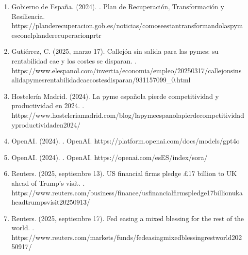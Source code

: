 \documentclass[letterpaper,10pt,spanish]{sphinxmanual}
\begin{document}
\begin{enumerate}
\item {} 
\sphinxAtStartPar
Gobierno de España. (2024). . Plan de Recuperación, Transformación y Resiliencia. https://planderecuperacion.gob.es/noticias/como\sphinxhyphen{}se\sphinxhyphen{}estan\sphinxhyphen{}transformando\sphinxhyphen{}las\sphinxhyphen{}pymes\sphinxhyphen{}con\sphinxhyphen{}el\sphinxhyphen{}plan\sphinxhyphen{}de\sphinxhyphen{}recuperacion\sphinxhyphen{}prtr

\item {} 
\sphinxAtStartPar
Gutiérrez, C. (2025, marzo 17). Callejón sin salida para las pymes: su rentabilidad cae y los costes se disparan. . https://www.elespanol.com/invertia/economia/empleo/20250317/callejon\sphinxhyphen{}sin\sphinxhyphen{}salida\sphinxhyphen{}pymes\sphinxhyphen{}rentabilidad\sphinxhyphen{}cae\sphinxhyphen{}costes\sphinxhyphen{}disparan/931157099\_0.html

\item {} 
\sphinxAtStartPar
Hostelería Madrid. (2024). La pyme española pierde competitividad y productividad en 2024. . https://www.hosteleriamadrid.com/blog/la\sphinxhyphen{}pyme\sphinxhyphen{}espanola\sphinxhyphen{}pierde\sphinxhyphen{}competitividad\sphinxhyphen{}y\sphinxhyphen{}productividad\sphinxhyphen{}en\sphinxhyphen{}2024/

\item {} 
\sphinxAtStartPar
OpenAI. (2024). . OpenAI. https://platform.openai.com/docs/models/gpt\sphinxhyphen{}4o

\item {} 
\sphinxAtStartPar
OpenAI. (2024). . OpenAI. https://openai.com/es\sphinxhyphen{}ES/index/sora/

\item {} 
\sphinxAtStartPar
Reuters. (2025, septiembre 13). US financial firms pledge £17 billion to UK ahead of Trump’s visit. . https://www.reuters.com/business/finance/us\sphinxhyphen{}financial\sphinxhyphen{}firms\sphinxhyphen{}pledge\sphinxhyphen{}17\sphinxhyphen{}billion\sphinxhyphen{}uk\sphinxhyphen{}ahead\sphinxhyphen{}trumps\sphinxhyphen{}visit\sphinxhyphen{}2025\sphinxhyphen{}09\sphinxhyphen{}13/

\item {} 
\sphinxAtStartPar
Reuters. (2025, septiembre 17). Fed easing a mixed blessing for the rest of the world. . https://www.reuters.com/markets/funds/fed\sphinxhyphen{}easing\sphinxhyphen{}mixed\sphinxhyphen{}blessing\sphinxhyphen{}rest\sphinxhyphen{}world\sphinxhyphen{}2025\sphinxhyphen{}09\sphinxhyphen{}17/


\end{enumerate}
\end{document}
